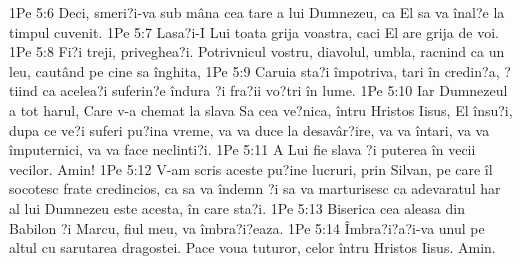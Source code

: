 1Pe 5:6  Deci, smeri?i-va sub mâna cea tare a lui Dumnezeu, ca El sa va înal?e la timpul cuvenit.
1Pe 5:7  Lasa?i-I Lui toata grija voastra, caci El are grija de voi.
1Pe 5:8  Fi?i treji, priveghea?i. Potrivnicul vostru, diavolul, umbla, racnind ca un leu, cautând pe cine sa înghita,
1Pe 5:9  Caruia sta?i împotriva, tari în credin?a, ?tiind ca acelea?i suferin?e îndura ?i fra?ii vo?tri în lume.
1Pe 5:10  Iar Dumnezeul a tot harul, Care v-a chemat la slava Sa cea ve?nica, întru Hristos Iisus, El însu?i, dupa ce ve?i suferi pu?ina vreme, va va duce la desavâr?ire, va va întari, va va împuternici, va va face neclinti?i.
1Pe 5:11  A Lui fie slava ?i puterea în vecii vecilor. Amin!
1Pe 5:12  V-am scris aceste pu?ine lucruri, prin Silvan, pe care îl socotesc frate credincios, ca sa va îndemn ?i sa va marturisesc ca adevaratul har al lui Dumnezeu este acesta, în care sta?i.
1Pe 5:13  Biserica cea aleasa din Babilon ?i Marcu, fiul meu, va îmbra?i?eaza.
1Pe 5:14  Îmbra?i?a?i-va unul pe altul cu sarutarea dragostei. Pace voua tuturor, celor întru Hristos Iisus. Amin.


